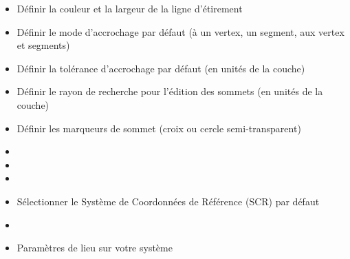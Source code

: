 
\begin{itemize}
\item Définir la couleur et la largeur de la ligne d'étirement
\item Définir le mode d'accrochage par défaut (à un vertex, un segment, aux vertex et segments)
\item Définir la tolérance d'accrochage par défaut (en unités de la couche) 
\item Définir le rayon de recherche pour l'édition des sommets (en unités de la couche) 
\item Définir les marqueurs de sommet (croix ou cercle semi-transparent)
\end{itemize}

%


\begin{itemize}
\item {}
\item {}
\item {}
\item Sélectionner le Système de Coordonnées de Référence (SCR) par défaut
\end{itemize}

%


\begin{itemize}
\item {}
\item Paramètres de lieu sur votre système 
\end{itemize}

